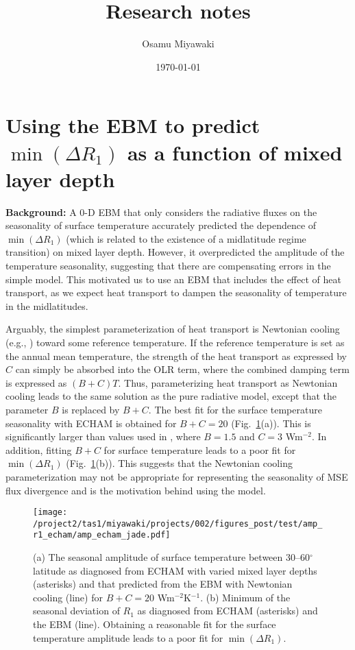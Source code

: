 \documentclass{article}
\title{Research notes}
\date{\today}
\author{Osamu Miyawaki}
\begin{document}
\maketitle

\section{Using the \cite{rose2017} EBM to predict $\min(\Delta R_1)$ as a function of mixed layer depth}
\textbf{Background:} A 0-D EBM that only considers the radiative fluxes on the seasonality of surface temperature accurately predicted the dependence of $\min(\Delta R_1)$ (which is related to the existence of a midlatitude regime transition) on mixed layer depth. However, it overpredicted the amplitude of the temperature seasonality, suggesting that there are compensating errors in the simple model. This motivated us to use an EBM that includes the effect of heat transport, as we expect heat transport to dampen the seasonality of temperature in the midlatitudes.

Arguably, the simplest parameterization of heat transport is Newtonian cooling (e.g., \cite{checlair2017}) toward some reference temperature. If the reference temperature is set as the annual mean temperature, the strength of the heat transport as expressed by $C$ can simply be absorbed into the OLR term, where the combined damping term is expressed as $(B+C)T$. Thus, parameterizing heat transport as Newtonian cooling leads to the same solution as the pure radiative model, except that the parameter $B$ is replaced by $B+C$. The best fit for the surface temperature seasonality with ECHAM is obtained for $B+C=20$ (Fig.~\ref{fig:amp-echam-jade}(a)). This is significantly larger than values used in \cite{checlair2017}, where $B=1.5$ and $C=3$ Wm$^{-2}$. In addition, fitting $B+C$ for surface temperature leads to a poor fit for $\min(\Delta R_1)$ (Fig.~\ref{fig:amp-echam-jade}(b)). This suggests that the Newtonian cooling parameterization may not be appropriate for representing the seasonality of MSE flux divergence and is the motivation behind using the \cite{rose2017} model.

\begin{figure}
    \texttt{[image: /project2/tas1/miyawaki/projects/002/figures\_post/test/amp\_r1\_echam/amp\_echam\_jade.pdf]}
    \caption{(a) The seasonal amplitude of surface temperature between 30--60$^{\circ}$ latitude as diagnosed from ECHAM with varied mixed layer depths (asterisks) and that predicted from the EBM with Newtonian cooling (line) for $B+C=20$ Wm$^{-2}$K$^{-1}$. (b) Minimum of the seasonal deviation of $R_{1}$ as diagnosed from ECHAM (asterisks) and the EBM (line). Obtaining a reasonable fit for the surface temperature amplitude leads to a poor fit for $\min(\Delta R_1)$.}
    \label{fig:amp-echam-jade}
\end{figure}
\end{document}
